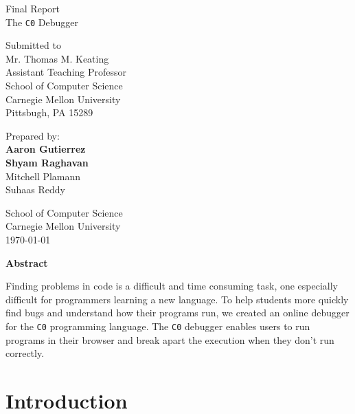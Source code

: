 \documentclass[11pt]{article}
\begin{document}
\setlength{\parindent}{2em}



\begin{titlepage}
\clearpage
\thispagestyle{empty}

\begin{center}
{\Huge Final Report}\\
\vspace{10 mm}
{\Huge The {\tt C0} Debugger}\\
\vspace{10 mm}

Submitted to\\
Mr. Thomas M. Keating\\
Assistant Teaching Professor\\
School of Computer Science\\
Carnegie Mellon University\\
Pittsbugh, PA 15289

\vspace{10 mm}

Prepared by:\\
{\bf Aaron Gutierrez}\\
{\bf Shyam Raghavan}\\
Mitchell Plamann\\
Suhaas Reddy

\vspace{10 mm}

School of Computer Science\\
Carnegie Mellon University\\
\today

\vspace{10 mm}

{\bf Abstract}
\end{center}
\par
Finding problems in code is a difficult and time consuming task, one especially
difficult for programmers learning a new language. To help students more quickly
find bugs and understand how their programs run, we created an online debugger
for the {\tt C0} programming language. The {\tt C0} debugger enables users to
run programs in their browser and break apart the execution when they don't run
correctly.
\end{titlepage}

\tableofcontents
\newpage


\section{Introduction}
\end{document}
